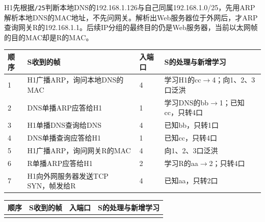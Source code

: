H1先根据\texttt{/\allowbreak{}25}判断本地DNS的192.168.1.126与自己同属192.168.1.0/25，先用ARP解析本地DNS的MAC地址，不先问网关。解析出Web服务器位于外网后，才ARP查询网关R的192.168.1.1。后续IP分组的最终目的仍是Web服务器，当前以太网帧的目的MAC却是R的MAC。

\begin{wideblock}

\par\medskip\noindent\begin{minipage}{\linewidth}\fontsize{9.3}{12}\selectfont\begin{tabularx}{\linewidth}{@{}YYYY@{}}
\toprule\noalign{}
\begin{minipage}[b]{\linewidth}\raggedright
顺序
\end{minipage} & \begin{minipage}[b]{\linewidth}\raggedright
S收到的帧
\end{minipage} & \begin{minipage}[b]{\linewidth}\raggedleft
入端口
\end{minipage} & \begin{minipage}[b]{\linewidth}\raggedright
S的处理与新增学习
\end{minipage} \\
\midrule\noalign{}


1 & H1广播ARP，询问本地DNS的MAC & 4 & 学习H1的cc\ensuremath{\to}4；向1、2、3口泛洪 \\
2 & DNS单播ARP应答给H1 & 1 & 学习DNS的bb\ensuremath{\to}1；已知cc，只转4口 \\
3 & H1单播DNS查询给DNS & 4 & 已知bb，只转1口 \\
4 & DNS单播查询应答给H1 & 1 & 已知cc，只转4口 \\
5 & H1广播ARP，询问网关R的MAC & 4 & 向1、2、3口泛洪 \\
6 & R单播ARP应答给H1 & 2 & 学习R的aa\ensuremath{\to}2；只转4口 \\
7 & H1向外网服务器发送TCP SYN，帧发给R & 4 & 已知aa，只转2口 \\
\bottomrule\end{tabularx}
\end{minipage}\par\medskip

\par\medskip\noindent\begin{minipage}{\linewidth}\fontsize{9.3}{12}\selectfont\begin{tabularx}{\linewidth}{@{}YYYY@{}}
\toprule\noalign{}
\begin{minipage}[b]{\linewidth}\raggedright
顺序
\end{minipage} & \begin{minipage}[b]{\linewidth}\raggedright
S收到的帧
\end{minipage} & \begin{minipage}[b]{\linewidth}\raggedleft
入端口
\end{minipage} & \begin{minipage}[b]{\linewidth}\raggedright
S的处理与新增学习
\end{minipage} \\
\midrule\noalign{}



\end{tabularx}
\end{minipage}
\end{wideblock}

